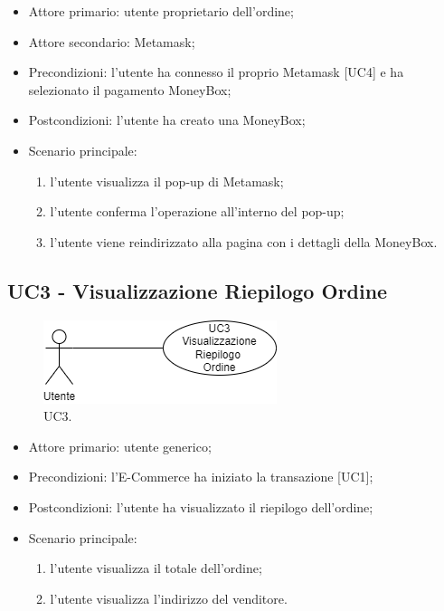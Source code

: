     \begin{itemize}
        \item Attore primario: utente proprietario dell'ordine;
        \item Attore secondario: Metamask;
        \item Precondizioni: l'utente ha connesso il proprio Metamask [UC4] e ha selezionato il pagamento MoneyBox;
        \item Postcondizioni: l'utente ha creato una MoneyBox;
        \item Scenario principale:
        \begin{enumerate}
            \item l'utente visualizza il pop-up di Metamask;
            \item l'utente conferma l'operazione all'interno del pop-up;
            \item l'utente viene reindirizzato alla pagina con i dettagli della MoneyBox.
        \end{enumerate}
        \end{itemize}

\subsection{UC3 - Visualizzazione Riepilogo Ordine}

\begin{figure}[H]
    \centering
    \includegraphics[scale=0.7]{immagini/UseCases-UC3.png}
    \caption{UC3.}
  \end{figure}

\begin{itemize}
    \item Attore primario: utente generico;
    \item Precondizioni: l'E-Commerce ha iniziato la transazione [UC1];
    \item Postcondizioni: l'utente ha visualizzato il riepilogo dell'ordine;
    \item Scenario principale:
    \begin{enumerate}
        \item l'utente visualizza il totale dell'ordine;
        \item l'utente visualizza l'indirizzo del venditore.
    \end{enumerate}
\end{itemize}

